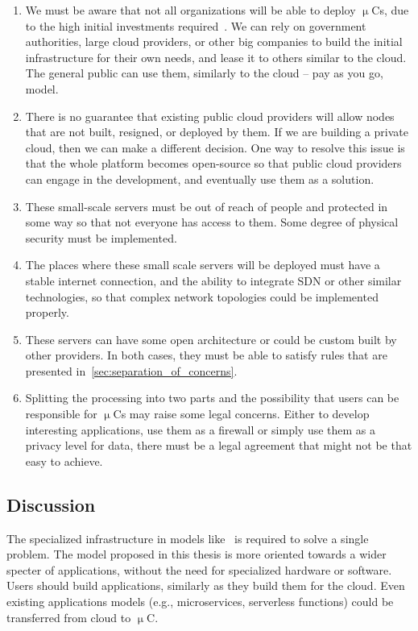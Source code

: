 \begin{enumerate}[start=1,label={(\bfseries \arabic*)}]
	\item We must be aware that not all organizations will be able to deploy $\upmu$Cs, due to the high initial investments required~\cite{MonsalveCC18}. We can rely on government authorities, large cloud providers, or other big companies to build the initial infrastructure for their own needs, and lease it to others similar to the cloud. The general public can use them, similarly to the cloud -- pay as you go, model.
	\item There is no guarantee that existing public cloud providers will allow nodes that are not built, resigned, or deployed by them. If we are building a private cloud, then  we can make a different decision. One way to resolve this issue is that the whole platform becomes open-source so that public cloud providers can engage in the development, and eventually use them as a solution.
	\item These small-scale servers must be out of reach of people and protected in some way so that not everyone has access to them. Some degree of physical security must be implemented.
	\item The places where these small scale servers will be deployed must have a stable internet connection, and the ability to integrate SDN or other similar technologies, so that complex network topologies could be implemented properly.
	\item These servers can have some open architecture or could be custom built by other providers. In both cases, they must be able to satisfy rules that are presented in~\ref{sec:separation_of_concerns}.
	\item Splitting the processing into two parts and the possibility that users can be responsible for $\upmu$Cs may raise some legal concerns. Either to develop interesting applications, use them as a firewall or simply use them as a privacy level for data, there must be a legal agreement that might not be that easy to achieve.
\end{enumerate}
%
%
\subsection{Discussion}
%
The specialized infrastructure in models like~\cite{BaccarelliNSSA17, GuoRG20, JeonK19, BCAK19, ChiariniRAMG13} is required to solve a single problem. The model proposed in this thesis is more oriented towards a wider specter of applications, without the need for specialized hardware or software. Users should build applications, similarly as they build them for the cloud. Even existing applications models (e.g., microservices, serverless functions) could be transferred from cloud to $\upmu$C.


